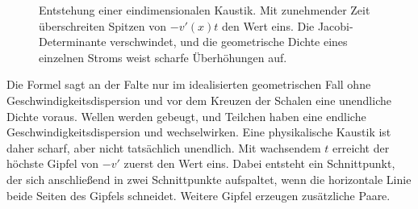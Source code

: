 \begin{figure}[htbp]
\centering
\begin{coursefitfigure}
\end{coursefitfigure}
\caption{Entstehung einer eindimensionalen Kaustik. Mit zunehmender Zeit überschreiten Spitzen von \(-v'(x)t\) den Wert eins. Die Jacobi-Determinante verschwindet, und die geometrische Dichte eines einzelnen Stroms weist scharfe Überhöhungen auf.}
\label{fig:c09-caustic-1d}
\end{figure}

Die Formel sagt an der Falte nur im idealisierten geometrischen Fall ohne Geschwindigkeitsdispersion und vor dem Kreuzen der Schalen eine unendliche Dichte voraus. Wellen werden gebeugt, und Teilchen haben eine endliche Geschwindigkeitsdispersion und wechselwirken. Eine physikalische Kaustik ist daher scharf, aber nicht tatsächlich unendlich. Mit wachsendem \(t\) erreicht der höchste Gipfel von \(-v'\) zuerst den Wert eins. Dabei entsteht ein Schnittpunkt, der sich anschließend in zwei Schnittpunkte aufspaltet, wenn die horizontale Linie beide Seiten des Gipfels schneidet. Weitere Gipfel erzeugen zusätzliche Paare.

